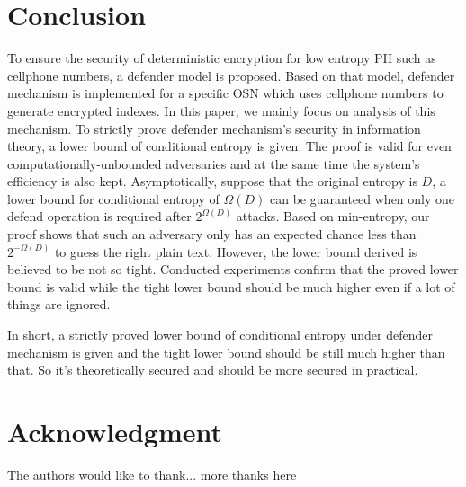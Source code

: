 \documentclass[10pt, conference, compsocconf]{IEEEtran}
\begin{document}
\section{Conclusion}
	To ensure the security of deterministic encryption
	for low entropy PII such as cellphone numbers,
	a defender model is proposed.
	Based on that model, defender mechanism is implemented for a specific
	OSN which uses cellphone numbers to generate encrypted indexes. 
	In this paper, we mainly focus on analysis of this mechanism.
	To strictly prove defender mechanism's security in information theory,
	a lower bound of conditional entropy is given.
	The proof is valid for even
	computationally-unbounded adversaries
	and at the same time the system's efficiency is also kept.
	Asymptotically, suppose that the original entropy is $D$,
	a lower bound for conditional entropy of $\Omega(D)$ can be
	guaranteed when only one defend operation is required after
	$2^{\Omega(D)}$ attacks.
	Based on min-entropy, our proof shows that
	such an adversary only has an expected chance 
	less than $2^{-\Omega(D)}$ to guess the right plain text.
	However, the lower bound derived
	is believed to be not so tight. 
	Conducted experiments confirm that the proved lower bound is valid while
	the tight lower bound
	should be much higher even if a lot of things are ignored.
	
	In short, a strictly proved lower bound of conditional entropy
	under defender mechanism is given
	and the tight lower bound should be still much higher than that.
	So it's theoretically secured and should be more secured in practical.	
	


\section*{Acknowledgment}


The authors would like to thank...
more thanks here




%
%
%
\end{document}
